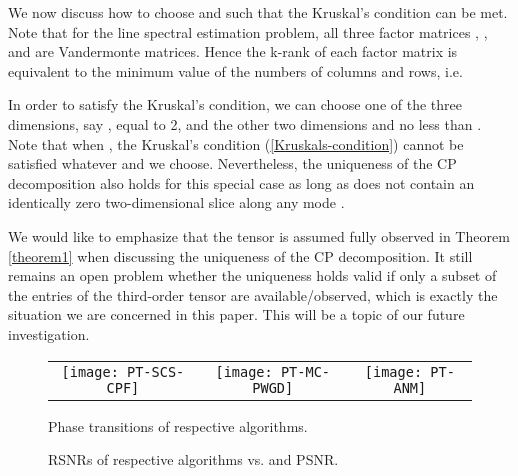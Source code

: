 \documentclass[10pt,journal,epsfig]{IEEEtran}
\begin{document}
We now discuss how to choose  and  such that the Kruskal's
condition can be met. Note that for the line spectral estimation
problem, all three factor matrices ,
, and  are Vandermonte matrices.
Hence the k-rank of each factor matrix is equivalent to the
minimum value of the numbers of columns and rows, i.e.

In order to satisfy the Kruskal's condition, we can choose one of
the three dimensions, say , equal to 2, and the other two
dimensions  and  no less than . Note that when
, the Kruskal's condition (\ref{Kruskals-condition}) cannot
be satisfied whatever  and  we choose. Nevertheless, the
uniqueness of the CP decomposition also holds for this special
case as long as  does not contain an
identically zero two-dimensional slice along any mode
\cite{SidiropoulosGiannakis00}.


We would like to emphasize that the tensor
 is assumed fully observed in Theorem
\ref{theorem1} when discussing the uniqueness of the CP
decomposition. It still remains an open problem whether the
uniqueness holds valid if only a subset of the entries of the
third-order tensor are available/observed, which is exactly the
situation we are concerned in this paper. This will be a topic of
our future investigation.


















\begin{figure*}[!t]
 \centering
\begin{tabular}{ccc}
\hspace*{-2ex}
\texttt{[image: PT-SCS-CPF]} &
\hspace*{-2ex}
\texttt{[image: PT-MC-PWGD]} &
\hspace*{-2ex}
\texttt{[image: PT-ANM]}
\end{tabular}
  \caption{Phase transitions of respective algorithms.}
   \label{fig1}
\end{figure*}


\begin{figure*}[!t]
 \centering
{}
 \hfil
{}
  \caption{RSNRs of respective algorithms vs.  and PSNR.}
   \label{fig2}
\end{figure*}
\end{document}
